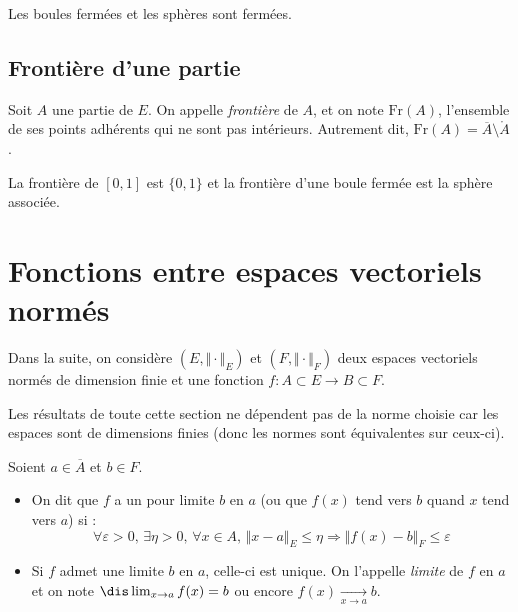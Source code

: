 \documentclass[a4paper,10pt]{report}
\begin{document}
%
%

\begin{cor} Les boules fermées et les sphères sont fermées.
\end{cor}

\begin{preuve}

\vspace{8cm}

\end{preuve}



\subsection{Frontière d'une partie}

\begin{defin} Soit $A$ une partie de $E$. On appelle \textit{frontière} de $A$, et on note $\textrm{Fr}(A)$, l'ensemble de ses points adhérents qui ne sont pas intérieurs. Autrement dit, $\textrm{Fr}(A) = \overline{A} \setminus \mathring{A}$.
\end{defin} 

\begin{ex} La frontière de $[0,1]$ est $\lbrace 0,1 \rbrace$ et la frontière d'une boule fermée est la sphère associée.
\end{ex}

\section{Fonctions entre espaces vectoriels normés}

\noindent Dans la suite, on considère $(E, \Vert \cdot \Vert_E)$ et $(F, \Vert \cdot \Vert_F)$ deux espaces vectoriels normés de dimension finie et une fonction $f : A \subset E \rightarrow B \subset F$.

\begin{thm} Les résultats de toute cette section ne dépendent pas de la norme choisie car les espaces sont de dimensions finies (donc les normes sont équivalentes sur ceux-ci).
\end{thm}


\begin{defip} Soient $a \in \overline{A}$ et $b \in F$.

\begin{itemize}
\item On dit que $f$ a un pour limite $b$ en $a$ (ou que $f(x)$ tend vers $b$ quand $x$ tend vers $a$) si :
$$ \forall \varepsilon >0, \, \exists \eta > 0, \, \forall x \in A, \, \Vert x- a \Vert_E \leq \eta \Rightarrow \Vert f(x) - b \Vert_F \leq \varepsilon$$
\item Si $f$ admet une limite $b$ en $a$, celle-ci est unique. On l'appelle \textit{limite} de $f$ en $a$ et on note $\dis \lim_{x \rightarrow a} f(x) = b$ ou encore $f(x) \underset{x \rightarrow a}{\rightarrow} b$.
\end{itemize}
\end{defip}
\end{document}
